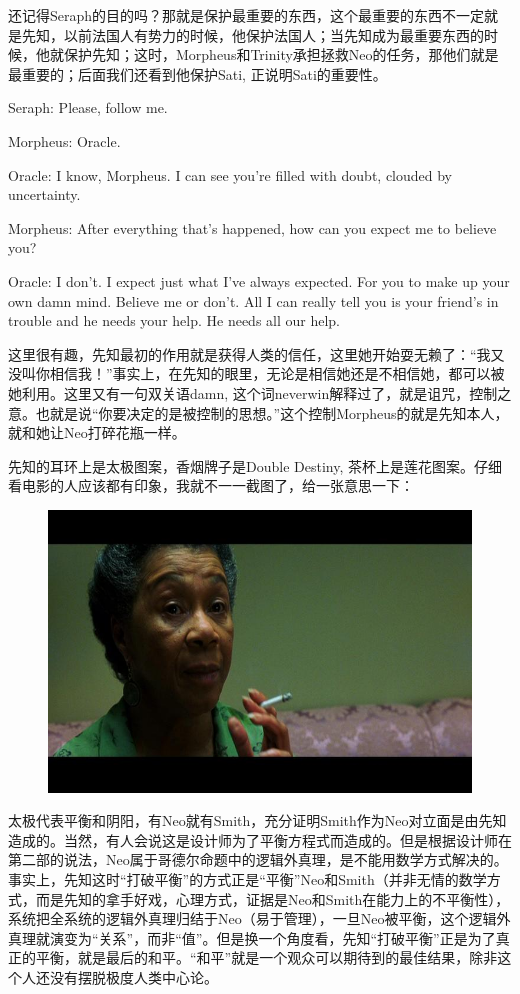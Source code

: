\documentclass[UTF8]{ctexart}
\newenvironment{myquote}{\color{green} \setlength{\leftskip}{6em} \setlength{\rightskip}{4em} \setlength{\parindent}{-2em}}{\par}
\begin{document}
还记得Seraph的目的吗？那就是保护最重要的东西，这个最重要的东西不一定就是先知，以前法国人有势力的时候，他保护法国人；当先知成为最重要东西的时候，他就保护先知；这时，Morpheus和Trinity承担拯救Neo的任务，那他们就是最重要的；后面我们还看到他保护Sati, 正说明Sati的重要性。

\begin{myquote}
Seraph: Please, follow me.

Morpheus: Oracle.

Oracle: I know, Morpheus. I can see you're filled with doubt, clouded by uncertainty.

Morpheus: After everything that's happened, how can you expect me to believe you?

Oracle: I don't. I expect just what I've always expected. For you to make up your own damn mind. Believe me or don't. All I can really tell you is your friend's in trouble and he needs your help. He needs all our help.
\end{myquote}

这里很有趣，先知最初的作用就是获得人类的信任，这里她开始耍无赖了：“我又没叫你相信我！”事实上，在先知的眼里，无论是相信她还是不相信她，都可以被她利用。这里又有一句双关语damn, 这个词neverwin解释过了，就是诅咒，控制之意。也就是说“你要决定的是被控制的思想。”这个控制Morpheus的就是先知本人，就和她让Neo打碎花瓶一样。

先知的耳环上是太极图案，香烟牌子是Double Destiny, 茶杯上是莲花图案。仔细看电影的人应该都有印象，我就不一一截图了，给一张意思一下：

\begin{figure}[htb]
\centering
\includegraphics[width=0.5\linewidth]{fig/14a938db9f7b7466d0164e8c.jpg}
\end{figure}

太极代表平衡和阴阳，有Neo就有Smith，充分证明Smith作为Neo对立面是由先知造成的。当然，有人会说这是设计师为了平衡方程式而造成的。但是根据设计师在第二部的说法，Neo属于哥德尔命题中的逻辑外真理，是不能用数学方式解决的。事实上，先知这时“打破平衡”的方式正是“平衡”Neo和Smith（并非无情的数学方式，而是先知的拿手好戏，心理方式，证据是Neo和Smith在能力上的不平衡性），系统把全系统的逻辑外真理归结于Neo（易于管理），一旦Neo被平衡，这个逻辑外真理就演变为“关系”，而非“值”。但是换一个角度看，先知“打破平衡”正是为了真正的平衡，就是最后的和平。“和平”就是一个观众可以期待到的最佳结果，除非这个人还没有摆脱极度人类中心论。
\end{document}
